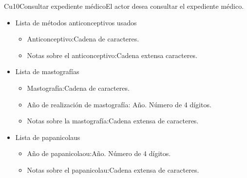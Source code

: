 \begin{UseCase}{Cu10}{Consultar expediente médico}{El actor desea consultar el expediente médico.}
{\begin{itemize}
        \item Lista de métodos anticonceptivos usados
        
        \begin{itemize}
             \item Anticonceptivo:Cadena de caracteres.
            \item Notas sobre el anticonceptivo:Cadena extensa caracteres.
        \end{itemize}
            
        \item Lista de mastografías
        
        \begin{itemize}
            \item Mastografía:Cadena de caracteres.
            \item Año de realización de  mastografía: Año. Número de 4 dígitos.
            \item Notas sobre la mastografía:Cadena extensa de caracteres.
        \end{itemize}
            
        \item Lista de papanicolaus
        
        \begin{itemize}
            \item Año de papanicolaou:Año. Número de 4 dígitos.
            \item Notas sobre el papanicolau:Cadena extensa de caracteres.
        \end{itemize}
        
        \end{itemize}
}
\end{UseCase}

